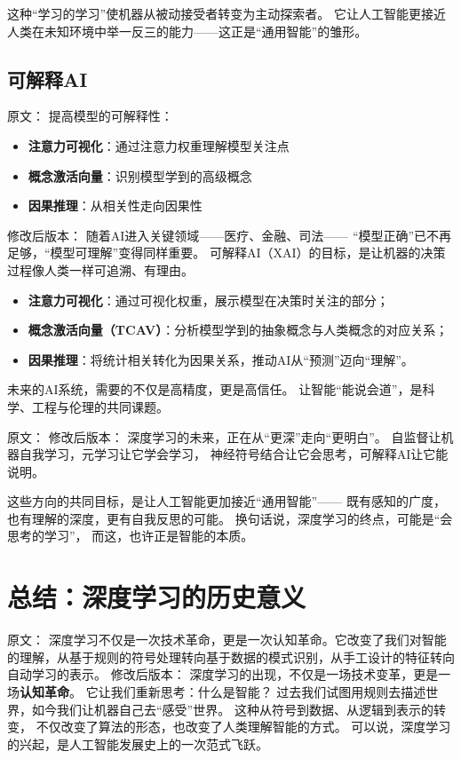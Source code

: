 这种“学习的学习”使机器从被动接受者转变为主动探索者。  
它让人工智能更接近人类在未知环境中举一反三的能力——这正是“通用智能”的雏形。



\subsection{可解释AI}

原文：
提高模型的可解释性：

\begin{itemize}
\item \textbf{注意力可视化}：通过注意力权重理解模型关注点
\item \textbf{概念激活向量}：识别模型学到的高级概念
\item \textbf{因果推理}：从相关性走向因果性
\end{itemize}
修改后版本：
随着AI进入关键领域——医疗、金融、司法——  
“模型正确”已不再足够，“模型可理解”变得同样重要。  
可解释AI（XAI）的目标，是让机器的决策过程像人类一样可追溯、有理由。

\begin{itemize}
\item \textbf{注意力可视化}：通过可视化权重，展示模型在决策时关注的部分；
\item \textbf{概念激活向量（TCAV）}：分析模型学到的抽象概念与人类概念的对应关系；
\item \textbf{因果推理}：将统计相关转化为因果关系，推动AI从“预测”迈向“理解”。
\end{itemize}

未来的AI系统，需要的不仅是高精度，更是高信任。  
让智能“能说会道”，是科学、工程与伦理的共同课题。



原文：
修改后版本：
深度学习的未来，正在从“更深”走向“更明白”。  
自监督让机器自我学习，元学习让它学会学习，  
神经符号结合让它会思考，可解释AI让它能说明。  

这些方向的共同目标，是让人工智能更加接近“通用智能”——  
既有感知的广度，也有理解的深度，更有自我反思的可能。  
换句话说，深度学习的终点，可能是“会思考的学习”，  
而这，也许正是智能的本质。


\section{总结：深度学习的历史意义}

原文：
深度学习不仅是一次技术革命，更是一次认知革命。它改变了我们对智能的理解，从基于规则的符号处理转向基于数据的模式识别，从手工设计的特征转向自动学习的表示。
修改后版本：
深度学习的出现，不仅是一场技术变革，更是一场\textbf{认知革命}。  
它让我们重新思考：什么是智能？  
过去我们试图用规则去描述世界，如今我们让机器自己去“感受”世界。  
这种从符号到数据、从逻辑到表示的转变，  
不仅改变了算法的形态，也改变了人类理解智能的方式。  
可以说，深度学习的兴起，是人工智能发展史上的一次范式飞跃。



